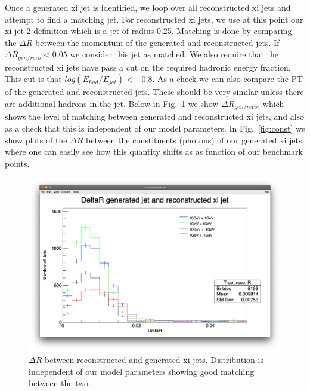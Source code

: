 \documentclass[aps,onecolumn,twoside,secnumarabic,balancelastpage,amsmath,amssymb,nofootinbib,hyperref=pdftex]{revtex4}
\begin{document}
Once a generated xi jet is identified, we loop over all reconstructed xi jets and attempt to find a matching jet. For reconstructed xi jets, we use at this point our xi-jet 2 definition which is a jet of radius 0.25. Matching is done by comparing the $\Delta R$ between the momentum of the generated and reconstructed jets. If $\Delta R_{gen/reco} < 0.05$ we consider this jet as matched. We also require that the reconstructed xi jets have pass a cut on the required hadronic energy fraction. This cut is that $log(E_{had}/E_{jet}) < -0.8$. As a check we can also compare the PT of the generated and reconstructed jets. These should be very similar unless there are additional hadrons in the jet. Below in Fig.~\ref{fig:gen_reco} we show $\Delta R_{gen/reco}$, which shows the level of matching between generated and reconstructed xi jets, and also as a check that this is independent of our model parameters. In Fig.~\ref{fig:const} we show plots of the $\Delta R$ between the constituents (photons) of our generated xi jets where one can easily see how this quantity shifts as as function of our benchmark points. 

\begin{figure}[t]
\begin{center}
\includegraphics[width=13cm]{deltaR_gen_reco.png}

\caption{$\Delta R$ between reconstructed and generated xi jets. Distribution is independent of our model parameters showing good matching between the two.}
\label{fig:gen_reco}
\end{center}
\end{figure}
\end{document}

